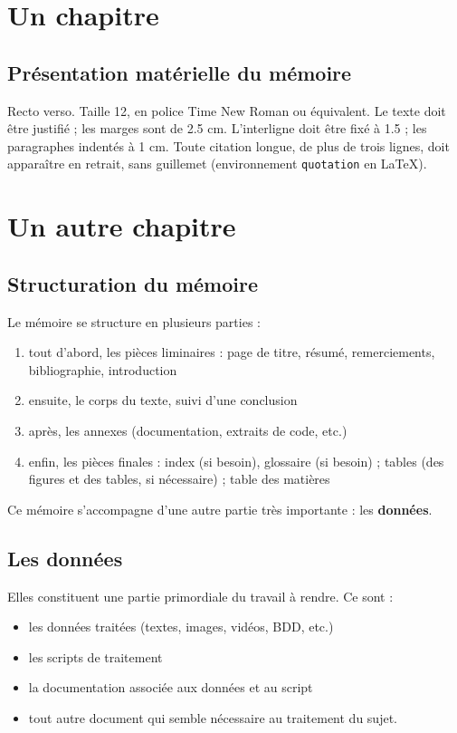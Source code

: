 \documentclass[a4paper,12pt,twoside]{book}
\begin{document}
	\chapter{Un chapitre}
	
	\section{Présentation matérielle du mémoire}
	
	Recto verso. Taille 12, en police Time New Roman ou équivalent. Le texte doit être justifié ; les marges sont de 2.5 cm. L'interligne doit être fixé à 1.5 ; les paragraphes indentés à 1 cm. Toute citation longue, de plus de trois lignes, doit apparaître en retrait, sans guillemet (environnement \texttt{quotation} en \LaTeX ).
	
	\chapter{Un autre chapitre}
	
	\section{Structuration du mémoire}
	
	Le mémoire se structure en plusieurs parties :
	\begin{enumerate}
		\item tout d'abord, les pièces liminaires : page de titre, résumé, remerciements, bibliographie, introduction
		\item ensuite, le corps du texte, suivi d'une conclusion
		\item après, les annexes (documentation, extraits de code, etc.)
		\item enfin, les pièces finales : index (si besoin), glossaire (si besoin) ; tables (des figures et des tables, si nécessaire) ; table des matières
	\end{enumerate}
	
	Ce mémoire s'accompagne d'une autre partie très importante : les \textbf{données}.
	
	\section{Les données}
	
	Elles constituent une partie primordiale du travail à rendre. Ce sont :
	\begin{itemize}
		\item les données traitées (textes, images, vidéos, BDD, etc.)
		\item les scripts de traitement
		\item la documentation associée aux données et au script
		\item tout autre document qui semble nécessaire au traitement du sujet.
	\end{itemize}
	
\end{document}
